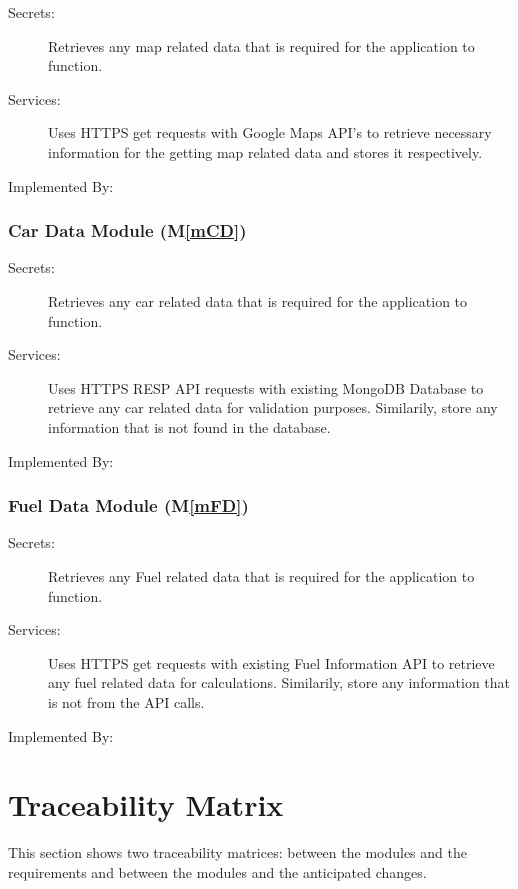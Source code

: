 \documentclass[12pt, titlepage]{article}
\newcommand{\mref}[1]{M\ref{#1}}
\begin{document}
\begin{description}
\item[Secrets:] Retrieves any map related data that is required for the application to function.
\item[Services:] Uses HTTPS get requests with Google Maps API's to retrieve necessary information 
for the getting map related data and stores it respectively.
\item[Implemented By:] \progname{}
\end{description}

\subsubsection{Car Data Module (\mref{mCD})}

\begin{description}
\item[Secrets:] Retrieves any car related data that is required for the application to function.
\item[Services:] Uses HTTPS RESP API requests with existing MongoDB Database to retrieve any car related 
data for validation purposes. Similarily, store any information that is not found in the database.
\item[Implemented By:] \progname{}
\end{description}

\subsubsection{Fuel Data Module (\mref{mFD})}

\begin{description}
\item[Secrets:] Retrieves any Fuel related data that is required for the application to function.
\item[Services:] Uses HTTPS get requests with existing Fuel Information API to retrieve any fuel related 
data for calculations. Similarily, store any information that is not from the API calls.
\item[Implemented By:] \progname{}
\end{description}

\section{Traceability Matrix} \label{SecTM}

This section shows two traceability matrices: between the modules and the
requirements and between the modules and the anticipated changes.
\end{document}
